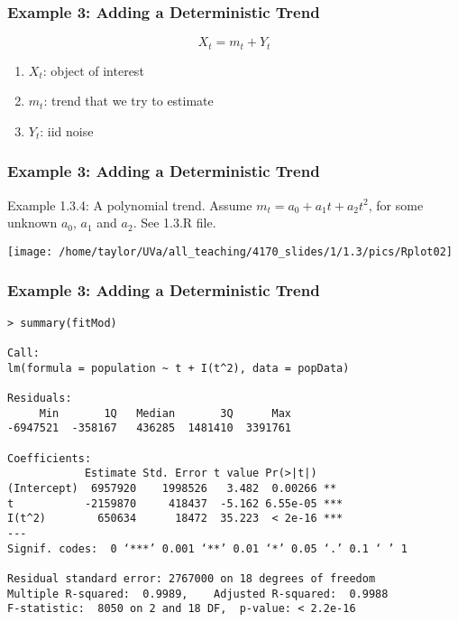 \documentclass{beamer}
\begin{document}

\begin{frame}[fragile]
\frametitle{Example 3: Adding a Deterministic Trend}

\[
X_t = m_t + Y_t
\]

\begin{enumerate}
\item $X_t$: object of interest
\item $m_t$: trend that we try to estimate
\item $Y_t$: iid noise
\end{enumerate}
\end{frame}

\begin{frame}[fragile]
\frametitle{Example 3: Adding a Deterministic Trend}

Example 1.3.4: A polynomial trend. Assume $m_t = a_0 + a_1t + a_2 t^2$, for some unknown $a_0$, $a_1$ and $a_2$. See 1.3.R file.\\

\begin{center}
\texttt{[image: /home/taylor/UVa/all\_teaching/4170\_slides/1/1.3/pics/Rplot02]}
\end{center}

\end{frame}


\begin{frame}[fragile]
\frametitle{Example 3: Adding a Deterministic Trend}

\begin{verbatim}
> summary(fitMod)

Call:
lm(formula = population ~ t + I(t^2), data = popData)

Residuals:
     Min       1Q   Median       3Q      Max 
-6947521  -358167   436285  1481410  3391761 

Coefficients:
            Estimate Std. Error t value Pr(>|t|)    
(Intercept)  6957920    1998526   3.482  0.00266 ** 
t           -2159870     418437  -5.162 6.55e-05 ***
I(t^2)        650634      18472  35.223  < 2e-16 ***
---
Signif. codes:  0 ‘***’ 0.001 ‘**’ 0.01 ‘*’ 0.05 ‘.’ 0.1 ‘ ’ 1

Residual standard error: 2767000 on 18 degrees of freedom
Multiple R-squared:  0.9989,	Adjusted R-squared:  0.9988 
F-statistic:  8050 on 2 and 18 DF,  p-value: < 2.2e-16
\end{verbatim}
\end{frame}
\end{document}
